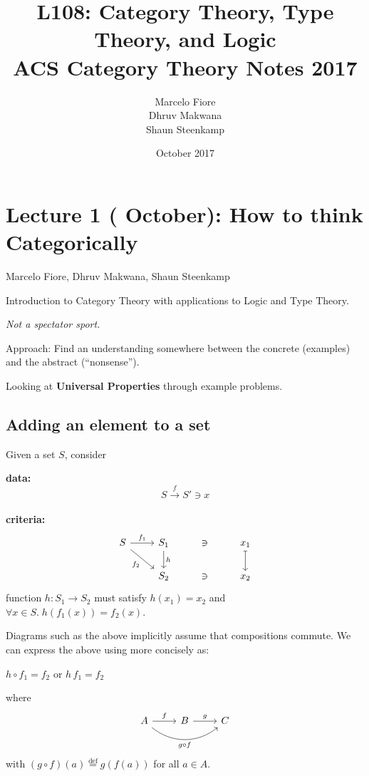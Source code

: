 \documentclass[a4paper, 12pt]{article}
\title{L108: Category Theory, Type Theory, and Logic\\
  ACS Category Theory Notes 2017}
\date{\nth{5} October 2017}
\author{Marcelo Fiore\\ Dhruv Makwana\\ Shaun Steenkamp}
\theoremstyle{definition}
\newcommand{\eqdef}{\stackrel{\text{def}}{=}} %
\newcommand{\comp}{\circ} %
\newcommand{\icomp}{\,} %
\begin{document}
\maketitle

\tableofcontents

\newpage
\section{Lecture 1 ( October): How to think Categorically}
\vspace*{-5mm}\hspace*{7.75mm}
Marcelo Fiore, Dhruv Makwana, Shaun Steenkamp
\bigskip

Introduction to Category Theory with applications to Logic and Type Theory.

\emph{Not a spectator sport.}

Approach: Find an understanding somewhere between the concrete (examples) and
the abstract (``nonsense'').

Looking at \textbf{Universal Properties} through example problems.

\subsection{Adding an element to a set}

Given a set $S$, consider

\textbf{data:} $$ S \overset{f}{\rightarrow} S' \ni x $$ \\
\textbf{criteria:} $$
    \begin{tikzcd}
        S \arrow[r, "f_1"]
          \arrow[dr, swap, "f_2"]
          &
        S_1 \arrow[d, "h"] & \ni & x_1 \arrow[d, mapsto]
          \\
          {}&
        S_2 & \ni & x_2
    \end{tikzcd}
$$
\quad function $h : S_1 \rightarrow S_2$ must satisfy $h(x_1) = x_2$ and 
$\forall x \in S .\; h(f_1(x)) = f_2(x)$.

\begin{framed}
Diagrams such as the above implicitly assume that compositions commute.  We
can express the above using more concisely as:
\begin{center}
$h\comp f_1 = f_2$
\quad or \quad
$h\icomp f_1 = f_2$
\end{center}
where 
$$
\begin{tikzcd}
    A \arrow[r, "f"] \arrow[rr, swap, bend right=40, "g \circ f"] & B \arrow[r, "g"] & C
\end{tikzcd}
$$
with $(g\comp f)(a)\eqdef g(f(a))$ for all $a\in A$.
\end{framed}
\end{document}
